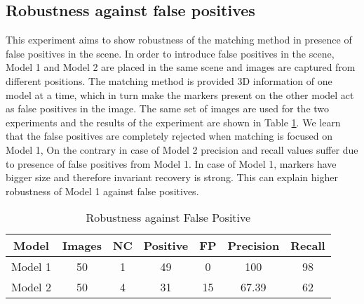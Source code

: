 \documentclass{bmvc2k}
\begin{document}
\subsection{Robustness against false positives}
This experiment aims to show robustness of the matching method in presence of false positives in the scene. 
In order to introduce false positives in the scene, Model 1 and Model 2 are placed in the same scene and images are captured from different positions. 
The matching method is provided 3D information of one model at a time, which in turn make the markers present on the other model act as false positives in the image. 
The same set of images are used for the two experiments and the results of the experiment are shown in Table \ref{tab:Exp3}.
We learn that the false positives are completely rejected when matching is focused on Model 1, On the contrary in case of Model 2 precision and recall values suffer due to presence of false positives from Model 1. 
In case of Model 1, markers have bigger size and therefore invariant recovery is strong. This can explain higher robustness of Model 1 against false positives. 
\begin{table}[tb]
\centering
\caption{Robustness against False Positive } 
\begin{tabular}{ | c | c | c | c | c | c | c |}
\hline
Model & Images & NC & Positive & FP & Precision & Recall \\ \hline
Model 1 & 50 & 1  & 49 & 0  & 100 & 98 \\
Model 2 & 50 & 4 & 31 & 15  & 67.39 & 62 \\ \hline
\end{tabular} \\
\label{tab:Exp3}
\end{table}
\end{document}
